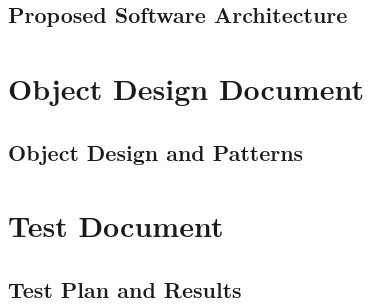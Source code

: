 \documentclass[10pt,a4paper,titlepage]{report}
\begin{document}
\chapter{Proposed Software Architecture}
\label{sec:proposed_architecture}


\part{Object Design Document}
\label{part:odd}

\chapter{Object Design and Patterns}
\label{sec:object_design}


\part{Test Document}
\label{part:test}

\chapter{Test Plan and Results}
\label{sec:test}



%


\appendix


%

%



\printglossary
\end{document}
